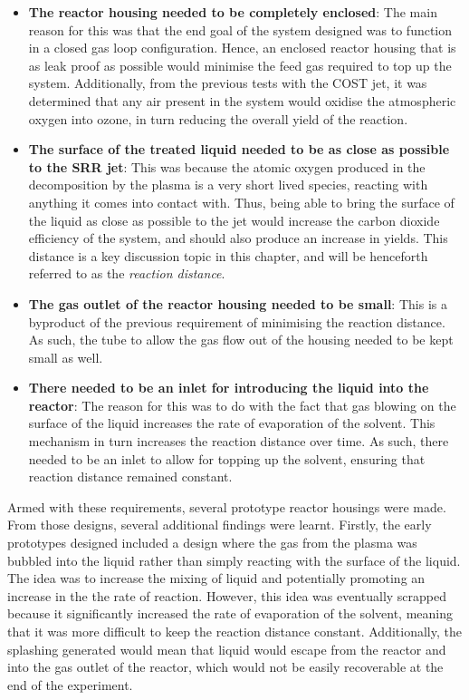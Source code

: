 \begin{itemize}
    \item \textbf{The reactor housing needed to be completely enclosed}: The main reason for this was that the end goal of the system designed was to function in a closed gas loop configuration. Hence, an enclosed reactor housing that is as leak proof as possible would minimise the feed gas required to top up the system. Additionally, from the previous tests with the COST jet, it was determined that any air present in the system would oxidise the atmospheric oxygen into ozone, in turn reducing the overall yield of the reaction.
    
    \item \textbf{The surface of the treated liquid needed to be as close as possible to the SRR jet}: This was because the atomic oxygen produced in the decomposition by the plasma is a very short lived species, reacting with anything it comes into contact with. Thus, being able to bring the surface of the liquid as close as possible to the jet would increase the carbon dioxide efficiency of the system, and should also produce an increase in yields. This distance is a key discussion topic in this chapter, and will be henceforth referred to as the \textit{reaction distance}.
    
    \item \textbf{The gas outlet of the reactor housing needed to be small}: This is a byproduct of the previous requirement of minimising the reaction distance. As such, the tube to allow the gas flow out of the housing needed to be kept small as well. 
    
    \item \textbf{There needed to be an inlet for introducing the liquid into the reactor}: The reason for this was to do with the fact that gas blowing on the surface of the liquid increases the rate of evaporation of the solvent. This mechanism in turn increases the reaction distance over time. As such, there needed to be an inlet to allow for topping up the solvent, ensuring that reaction distance remained constant. 
\end{itemize}

Armed with these requirements, several prototype reactor housings were made. From those designs, several additional findings were learnt. Firstly, the early prototypes designed included a design where the gas from the plasma was bubbled into the liquid rather than simply reacting with the surface of the liquid. The idea was to increase the mixing of liquid and potentially promoting an increase in the the rate of reaction. However, this idea was eventually scrapped because it significantly increased the rate of evaporation of the solvent, meaning that it was more difficult to keep the reaction distance constant. Additionally, the splashing generated would mean that liquid would escape from the reactor and into the gas outlet of the reactor, which would not be easily recoverable at the end of the experiment.

